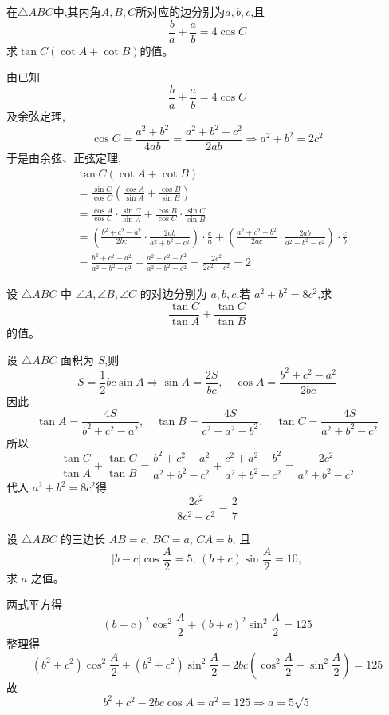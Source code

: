 \begin{questions}
    \question 在$\triangle ABC$中,其内角$A,B,C$所对应的边分别为$a,b,c$,且
    \[
    \dfrac{b}{a}+\dfrac{a}{b}=4\cos C
    \]
    求$\tan C(\cot A+\cot B)$的值。
    \begin{solution}
        由已知$$\frac{b}{a}+\frac{a}{b}=4\cos C$$及余弦定理,
        \[
        \cos C= \frac{a^2+b^2}{4ab} = \frac{a^2+b^2-c^2}{2ab} \Rightarrow a^2+b^2 = 2c^2
        \]
        于是由余弦、正弦定理,
        \begin{align*}
        &\tan C(\cot A+\cot B) \\
        &= \frac{\sin C}{\cos C}\left( \frac{\cos A}{\sin A} + \frac{\cos B}{\sin B} \right)\\
        &= \frac{\cos A}{\cos C} \cdot \frac{\sin C}{\sin A} + \frac{\cos B}{\cos C} \cdot \frac{\sin C}{\sin B}\\
        &= \left( \frac{b^2+c^2-a^2}{2bc} \cdot \frac{2ab}{a^2+b^2-c^2} \right) \cdot \frac{c}{a} + \left( \frac{a^2+c^2-b^2}{2ac} \cdot \frac{2ab}{a^2+b^2-c^2} \right) \cdot \frac{c}{b} \\
        &= \frac{b^2+c^2-a^2}{a^2+b^2-c^2} + \frac{a^2+c^2-b^2}{a^2+b^2-c^2}
        = \frac{2c^2}{2c^2-c^2} = 2
        \end{align*}
    \end{solution}

    \question 设 $\triangle ABC$ 中 $\angle A,\angle B,\angle C$ 的对边分别为 $a,b,c$,若 $a^2+b^2=8c^2$,求
    \[
    \frac{\tan C}{\tan A} + \frac{\tan C}{\tan B}
    \]
    的值。
    \begin{solution}
        设 $\triangle ABC$ 面积为 $S$,则
        \[
        S = \frac{1}{2}bc \sin A \Rightarrow \sin A = \frac{2S}{bc}, \quad \cos A = \frac{b^2+c^2-a^2}{2bc}
        \]
        因此
        \[
        \tan A = \frac{4S}{b^2+c^2-a^2}, \quad \tan B = \frac{4S}{c^2+a^2-b^2}, \quad \tan C = \frac{4S}{a^2+b^2-c^2}
        \]
        所以
        \[
        \frac{\tan C}{\tan A} + \frac{\tan C}{\tan B} = \frac{b^2+c^2-a^2}{a^2+b^2-c^2} + \frac{c^2+a^2-b^2}{a^2+b^2-c^2} = \frac{2c^2}{a^2+b^2-c^2}
        \]
        代入 $a^2+b^2 = 8c^2$得
        \[
        \frac{2c^2}{8c^2 - c^2} = \frac{2}{7}
        \]
    \end{solution}

    \question 设 $\triangle ABC$ 的三边长 $AB=c,\,BC=a,\,CA=b$, 且 
    \[
    |b-c|\cos\frac{A}{2}=5,\,(b+c)\sin\frac{A}{2}=10,
    \]求 $a$ 之值。 
    \begin{solution}
        两式平方得
        \[
        (b-c)^2 \cos^2 \frac{A}{2} + (b+c)^2 \sin^2 \frac{A}{2} = 125
        \]
        整理得
        \[
        (b^2+c^2)\cos^2 \frac{A}{2} + (b^2+c^2)\sin^2 \frac{A}{2} - 2bc(\cos^2 \frac{A}{2} - \sin^2 \frac{A}{2}) = 125
        \]
        故
        \[
        b^2+c^2-2bc\cos A = a^2 = 125 \Rightarrow a = 5\sqrt{5}
        \]
    \end{solution}


\end{questions}
